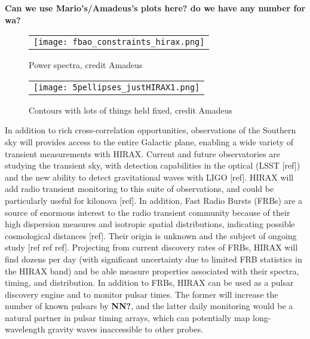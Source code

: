 \documentclass[]{spie}  %
\begin{document}
\textbf{Can we use Mario's/Amadeus's plots here? do we have any number for wa?}

 \begin{figure} [ht]
  \begin{center}
   \begin{tabular}{c} %
   \texttt{[image: fbao\_constraints\_hirax.png]}
   \end{tabular}
   \end{center}
   \caption[Power Spectra] 
   { \label{fig:pspec} 
Power spectra, credit Amadeus }
   \end{figure} 

  \begin{figure} [ht]
  \begin{center}
   \begin{tabular}{c} %
   \texttt{[image: 5pellipses\_justHIRAX1.png]}
   \end{tabular}
   \end{center}
   \caption[Contours] 
   { \label{fig:contours} 
Contours with lots of things held fixed, credit Amadeus}
   \end{figure} 


In addition to rich cross-correlation opportunities, observations of the Southern sky will provides access to the entire Galactic plane, enabling a wide variety of transient measurements with HIRAX. Current and future observatories are studying the transient sky, with detection capabilities in the optical (LSST [ref]) and the new ability to detect gravitational waves with LIGO [ref]. HIRAX will add radio transient monitoring to this suite of observations, and could be particularly useful for kilonova [ref]. In addition, Fast Radio Bursts (FRBs) are a source of enormous interest to the radio transient community because of their high dispersion measures and isotropic spatial distributions, indicating possible cosmological distances [ref]. Their origin is unknown and the subject of ongoing study [ref ref ref]. Projecting from current discovery rates of FRBs, HIRAX will find dozens per day (with significant uncertainty due to limited FRB statistics in the HIRAX band) and be able measure properties associated with their spectra, timing, and distribution. In addition to FRBs, HIRAX can be used as a pulsar discovery engine and to monitor pulsar times. The former will increase the number of known pulsars by \textbf{NN?}, and the latter daily monitoring would be a natural partner in pulsar timing arrays, which can potentially map long-wavelength gravity waves inaccessible to other probes. \newline 
\end{document}
